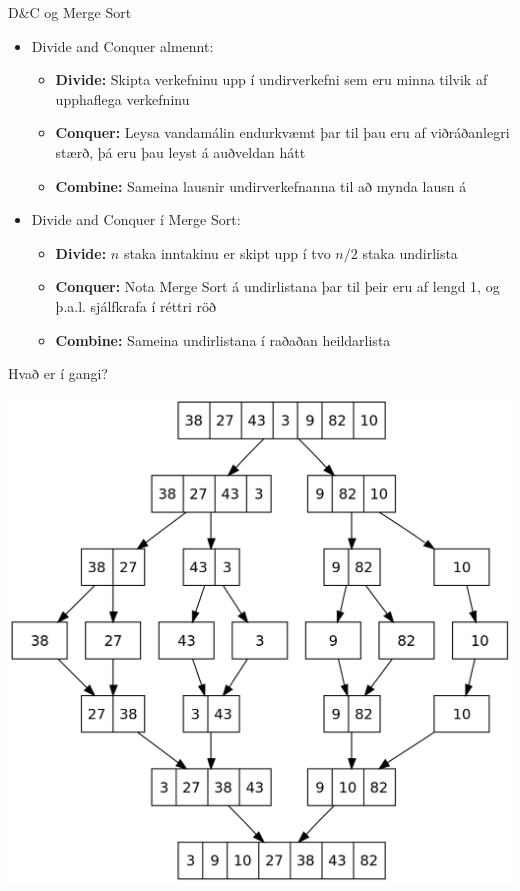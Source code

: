 \documentclass{beamer}
\begin{document}
\begin{frame}{D\&C og Merge Sort}
\begin{itemize}
 \item Divide and Conquer almennt:
 \begin{itemize}
  \item \textbf{Divide:} Skipta verkefninu upp í undirverkefni sem eru minna tilvik af upphaflega verkefninu
  \item \textbf{Conquer:} Leysa vandamálin endurkvæmt þar til þau eru af viðráðanlegri stærð, þá eru þau leyst á auðveldan hátt
  \item \textbf{Combine:} Sameina lausnir undirverkefnanna til að mynda lausn á 
 \end{itemize}
 \item Divide and Conquer í Merge Sort: 
 \begin{itemize}
  \item \textbf{Divide:} $n$ staka inntakinu er skipt upp í tvo $n/2$ staka undirlista
  \item \textbf{Conquer:} Nota Merge Sort á undirlistana þar til þeir eru af lengd 1, og þ.a.l. sjálfkrafa í réttri röð
  \item \textbf{Combine:} Sameina undirlistana í raðaðan heildarlista
 \end{itemize}
\end{itemize}
\end{frame}

\begin{frame}{Hvað er í gangi?}
\vspace{-0.1\textheight}
\begin{center}
\includegraphics[height=0.8\textheight]{Pics/merge-sort-diagram}
\end{center}
\end{frame}
\end{document}
